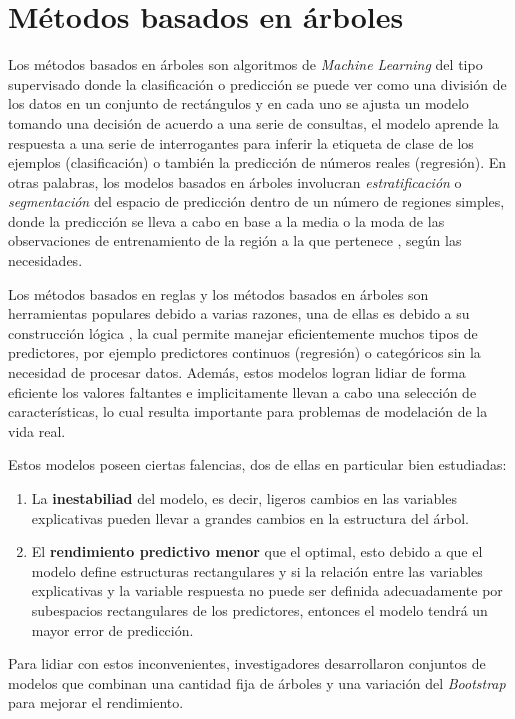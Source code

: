 %
%
%
%
\section{Métodos basados en árboles}

Los métodos basados en árboles son algoritmos de \textit{Machine Learning} del tipo supervisado donde la  
clasificación o predicción se puede ver como una división de los datos en un conjunto de rectángulos \cite{13} y en
cada uno se ajusta un modelo tomando una decisión de acuerdo a una serie de consultas, el modelo
aprende la respuesta a una serie de interrogantes para inferir la etiqueta de clase de los
ejemplos (clasificación) o también la predicción de números reales (regresión). En otras palabras, 
los modelos basados en árboles involucran \textit{estratificación} o \textit{segmentación} del 
espacio de predicción dentro de un número de regiones simples, donde la predicción se lleva a cabo 
en base a la media o la moda de las observaciones de entrenamiento de la región a la que pertenece \cite{14}, según las necesidades.

Los métodos basados en reglas y los métodos basados en árboles son herramientas populares debido a varias razones,
una de ellas es debido a su construcción lógica \cite{18}, la cual permite manejar eficientemente muchos tipos de predictores, 
por ejemplo predictores continuos (regresión) o categóricos sin la necesidad de procesar datos. Además,
estos modelos logran lidiar de forma eficiente los valores faltantes e implicitamente llevan a cabo una selección de características,
lo cual resulta importante para problemas de modelación de la vida real.

Estos modelos poseen ciertas falencias, dos de ellas en particular bien estudiadas:
\newpage
\begin{enumerate}
    \item La \textbf{inestabiliad} del modelo, es decir, ligeros cambios en las variables explicativas 
          pueden llevar a grandes cambios en la estructura del árbol.
    \item El \textbf{rendimiento predictivo menor} que el optimal, esto debido a que el modelo define estructuras rectangulares y si 
          la relación entre las variables explicativas y la variable respuesta no puede ser definida adecuadamente por
          subespacios rectangulares de los predictores, entonces el modelo tendrá un mayor error de predicción.
\end{enumerate} 


Para lidiar con estos inconvenientes, investigadores desarrollaron conjuntos de modelos que combinan una cantidad fija de árboles
y una variación del \textit{Bootstrap} para mejorar el rendimiento.


